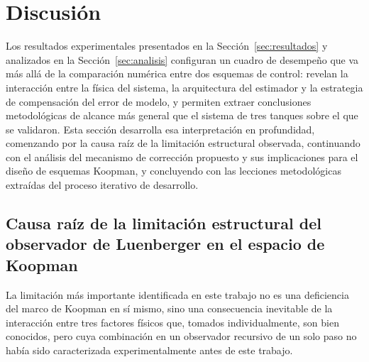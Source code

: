 \documentclass[12pt,letterpaper]{article}
\begin{document}
\section{Discusión}
\label{sec:discusion}

Los resultados experimentales presentados en la 
Sección~\ref{sec:resultados} y analizados en la 
Sección~\ref{sec:analisis} configuran un cuadro de desempeño que 
va más allá de la comparación numérica entre dos esquemas de 
control: revelan la interacción entre la física del sistema, la 
arquitectura del estimador y la estrategia de compensación del 
error de modelo, y permiten extraer conclusiones metodológicas 
de alcance más general que el sistema de tres tanques sobre el 
que se validaron. Esta sección desarrolla esa interpretación en 
profundidad, comenzando por la causa raíz de la limitación 
estructural observada, continuando con el análisis del mecanismo 
de corrección propuesto y sus implicaciones para el diseño de 
esquemas Koopman, y concluyendo con las lecciones metodológicas 
extraídas del proceso iterativo de desarrollo.

\subsection{Causa raíz de la limitación estructural del observador 
de Luenberger en el espacio de Koopman}
\label{sec:discusion_limitacion}

La limitación más importante identificada en este trabajo no es 
una deficiencia del marco de Koopman en sí mismo, sino una 
consecuencia inevitable de la interacción entre tres factores 
físicos que, tomados individualmente, son bien conocidos, pero 
cuya combinación en un observador recursivo de un solo paso no 
había sido caracterizada experimentalmente antes de este trabajo.
\end{document}
